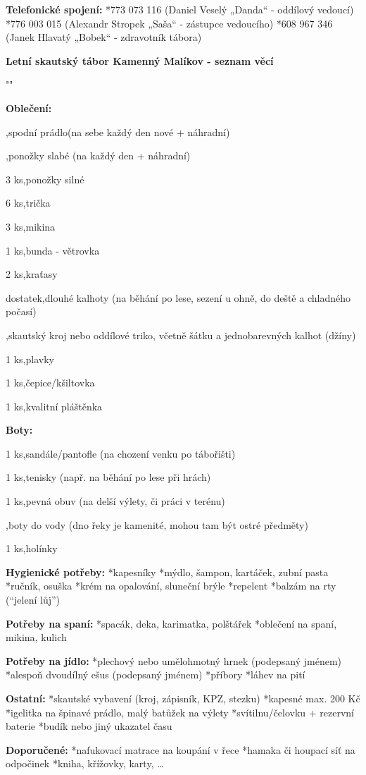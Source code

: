 \parindent=0cm

{\bf Telefonické spojení:}
\begitems
*773 073 116 (Daniel Veselý „Danda“ - oddílový vedoucí)
*776 003 015 (Alexandr Stropek „Saša“ - zástupce vedoucího)
*‭608 967 346‬ (Janek Hlavatý „Bobek“ - zdravotník tábora)
\enditems
\vfil\break

\centerline{\typosize[14/13]\bf Letní skautský tábor Kamenný Malíkov - seznam věcí}
\bigskip
{{ "\def\item#1,#2{\par\hbox{\hbox to 2cm{#1\hfil}#2\hfil}}" }}


{\bf Oblečení:}\smallskip
\item,{spodní prádlo(na sebe každý den nové + náhradní)}
\item,{ponožky slabé (na každý den + náhradní)}
\item{3 ks},{ponožky silné}
\item{6 ks},{trička}
\item{3 ks},{mikina}
\item{1 ks},{bunda - větrovka}
\item{2 ks},{kraťasy}
\item{dostatek},{dlouhé kalhoty (na běhání po lese, sezení u ohně, do deště a chladného počasí)}
\item{},{skautský kroj nebo oddílové triko, včetně šátku a jednobarevných kalhot (džíny)}
\item{1 ks},{plavky}
\item{1 ks},{čepice/kšiltovka}
\item{1 ks},{kvalitní pláštěnka}

\vskip 0.5cm
{\bf Boty:}\smallskip
\item{1 ks},{sandále/pantofle (na chození venku po tábořišti)}
\item{1 ks},{tenisky (např. na běhání po lese při hrách)}
\item{1 ks},{pevná obuv (na delší výlety, či práci v terénu)}
\item{},{boty do vody (dno řeky je kamenité, mohou tam být ostré předměty)}
\item{1 ks},{holínky}
\vskip 0.5cm

{\bf Hygienické potřeby:}\smallskip
\begitems
*kapesníky 
*mýdlo, šampon, kartáček, zubní pasta
*ručník, osuška
*krém na opalování, sluneční brýle
*repelent
*balzám na rty (“jelení lůj”)
\enditems

{\bf Potřeby na spaní:}\smallskip
\begitems
*spacák, deka, karimatka, polštářek
*oblečení na spaní, mikina, kulich
\enditems

{\bf Potřeby na jídlo:}\smallskip
\begitems
*plechový nebo umělohmotný hrnek (podepsaný jménem)
*alespoň dvoudílný ešus (podepsaný jménem)
*příbory
*láhev na pití
\enditems

{\bf Ostatní:}\smallskip
\begitems
*skautské vybavení (kroj, zápisník, KPZ, stezku)
*kapesné max. 200 Kč
*igelitka na špinavé prádlo, malý batůžek na výlety
*svítilnu/čelovku + rezervní baterie
*budík nebo jiný ukazatel času
\enditems

{\bf Doporučené:}\smallskip
\begitems
*nafukovací matrace na koupání v řece
*hamaka či houpací síť na odpočinek
*kniha, křížovky, karty, …
\enditems
\bye
